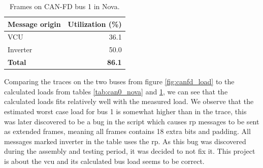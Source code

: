 \begin{table}[H]
    \centering
    \caption{Frames on CAN-FD bus 1 in Nova.}
    \begin{tabular}{lr}
        \toprule
        Message origin & Utilization (\%) \\
        \midrule
        VCU & 36.1 \\
        Inverter & 50.0 \\
        \textbf{Total} & \textbf{86.1} \\
        \bottomrule
    \end{tabular}
    \label{tab:can1_nova}
\end{table}

Comparing the traces on the two buses from figure \ref{fig:canfd_load} to the calculated loads from tables \ref{tab:can0_nova} and \ref{tab:can1_nova}, we can see that the calculated loads fits relatively well with the measured load. We observe that the estimated worst case load for bus 1 is somewhat higher than in the trace, this was later discovered to be a bug in the script which causes \acrlong{rp} messages to be sent as extended frames, meaning all frames contains 18 extra bits and padding. All messages marked inverter in the table uses the \acrlong{rp}. As this bug was discovered during the assembly and testing period, it was decided to not fix it. This project is about the \acrshort{vcu} and its calculated bus load seems to be correct.






